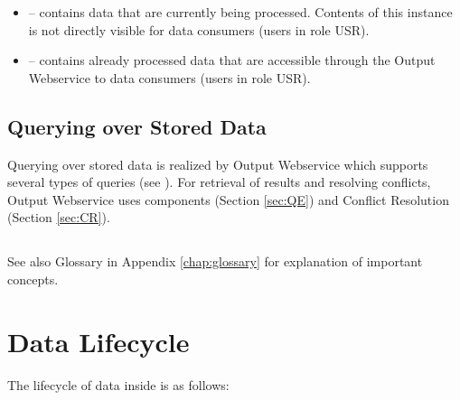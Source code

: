 \begin{itemize}
	\item {} -- contains data that are currently being processed. Contents of this instance is not directly visible for data consumers (users in role USR).
	\item {} -- contains already processed data that are accessible through the Output Webservice to data consumers (users in role USR).
\end{itemize}

\subsection{Querying over Stored Data}
Querying over stored data is realized by Output Webservice which supports several types of queries (see ). For retrieval of results and resolving conflicts, Output Webservice uses components \QE (Section \ref{sec:QE}) and Conflict Resolution (Section \ref{sec:CR}).

\subsection*{}

See also Glossary in Appendix \ref{chap:glossary} for explanation of important concepts.

\section{Data Lifecycle}
\label{sec:dataLifecycle}

The lifecycle of data inside \odcs is as follows:

